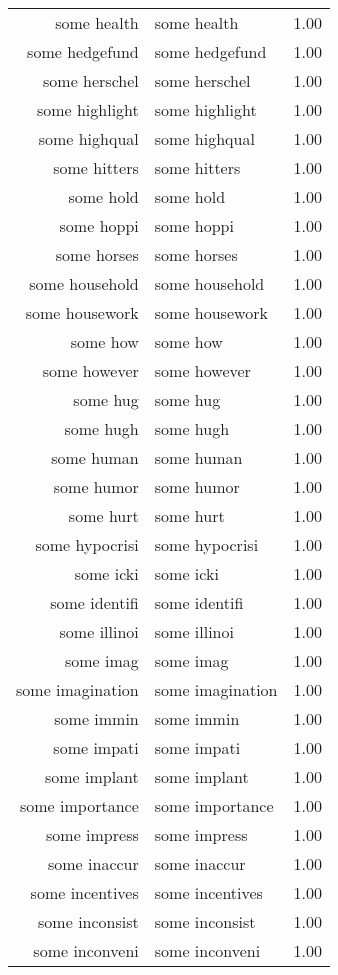 \begin{table}[ht]
\begin{tabular}{rlr}
  some health & some health & 1.00 \\ 
  some hedgefund & some hedgefund & 1.00 \\ 
  some herschel & some herschel & 1.00 \\ 
  some highlight & some highlight & 1.00 \\ 
  some highqual & some highqual & 1.00 \\ 
  some hitters & some hitters & 1.00 \\ 
  some hold & some hold & 1.00 \\ 
  some hoppi & some hoppi & 1.00 \\ 
  some horses & some horses & 1.00 \\ 
  some household & some household & 1.00 \\ 
  some housework & some housework & 1.00 \\ 
  some how & some how & 1.00 \\ 
  some however & some however & 1.00 \\ 
  some hug & some hug & 1.00 \\ 
  some hugh & some hugh & 1.00 \\ 
  some human & some human & 1.00 \\ 
  some humor & some humor & 1.00 \\ 
  some hurt & some hurt & 1.00 \\ 
  some hypocrisi & some hypocrisi & 1.00 \\ 
  some icki & some icki & 1.00 \\ 
  some identifi & some identifi & 1.00 \\ 
  some illinoi & some illinoi & 1.00 \\ 
  some imag & some imag & 1.00 \\ 
  some imagination & some imagination & 1.00 \\ 
  some immin & some immin & 1.00 \\ 
  some impati & some impati & 1.00 \\ 
  some implant & some implant & 1.00 \\ 
  some importance & some importance & 1.00 \\ 
  some impress & some impress & 1.00 \\ 
  some inaccur & some inaccur & 1.00 \\ 
  some incentives & some incentives & 1.00 \\ 
  some inconsist & some inconsist & 1.00 \\ 
  some inconveni & some inconveni & 1.00 \\ 

\end{tabular}
\end{table}
